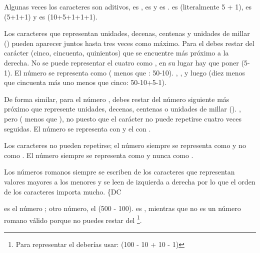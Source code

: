 \begin{itemize}

\item{Algunas veces los caracteres son aditivos,  es ,  es  y  es .  es  (literalmente 5 + 1),  es  (5+1+1) y  es  (10+5+1+1+1).

\item Los caracteres que representan unidades, decenas, centenas y unidades de millar () pueden aparecer juntos hasta tres veces como máximo. Para el  debes restar del carácter  (cinco, cincuenta, quinientos) que se encuentre más próximo a la derecha. No se puede representar el cuatro como , en su lugar hay que poner  (5-1). El número  se representa como  ( menos que : 50-10). , ,  y luego  (diez menos que cincuenta más uno menos que cinco: 50-10+5-1).

\item De forma similar, para el número , debes restar del número siguiente más próximo que represente unidades, decenas, centenas o unidades de millar (). , pero  ( menos que ), no  puesto que el carácter  no puede repetirse cuatro veces seguidas. El número  se representa con  y el  con .

\item Los caracteres  no pueden repetirse; el número  siempre se representa como  y no como . El número  siempre se representa como  y nunca como .

\item Los números romanos siempre se escriben de los caracteres que representan valores mayores a los menores y se leen de izquierda a derecha por lo que el orden de los caracteres importa mucho. \{DC} es el número ;  otro número, el  (500 - 100).  es , mientras que  no es un número romano válido porque no puedes restar  del \footnote{Para representar el  deberías usar:  (100 - 10 + 10 - 1)}.

\end{itemize}

